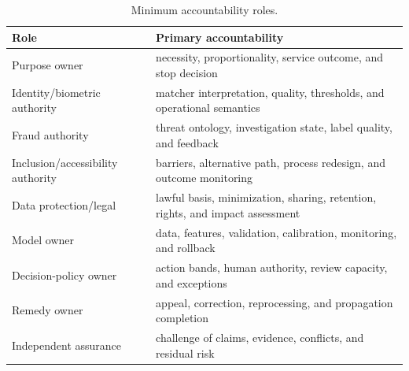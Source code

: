 \begin{table}[htbp]
\centering
\caption{Minimum accountability roles.}
\begin{tabularx}{\textwidth}{p{36mm}Y}
\toprule
Role & Primary accountability\\
\midrule
Purpose owner & necessity, proportionality, service outcome, and stop decision\\
Identity/biometric authority & matcher interpretation, quality, thresholds, and operational semantics\\
Fraud authority & threat ontology, investigation state, label quality, and feedback\\
Inclusion/accessibility authority & barriers, alternative path, process redesign, and outcome monitoring\\
Data protection/legal & lawful basis, minimization, sharing, retention, rights, and impact assessment\\
Model owner & data, features, validation, calibration, monitoring, and rollback\\
Decision-policy owner & action bands, human authority, review capacity, and exceptions\\
Remedy owner & appeal, correction, reprocessing, and propagation completion\\
Independent assurance & challenge of claims, evidence, conflicts, and residual risk\\
\bottomrule
\end{tabularx}
\end{table}

